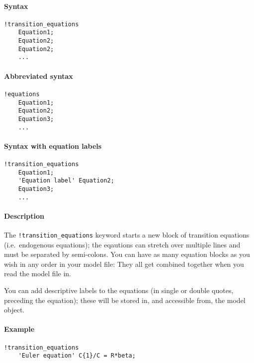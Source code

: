 


	\paragraph{Syntax}

\begin{verbatim}
!transition_equations
    Equation1;
    Equation2;
    Equation2;
    ...
\end{verbatim}

\paragraph{Abbreviated syntax}

\begin{verbatim}
!equations
    Equation1;
    Equation2;
    Equation3;
    ...
\end{verbatim}

\paragraph{Syntax with equation
labels}

\begin{verbatim}
!transition_equations
    Equation1;
    'Equation label' Equation2;
    Equation3;
    ...
\end{verbatim}

\paragraph{Description}

The \texttt{!transition\_equations} keyword starts a new block of
transition equations (i.e.~endogenous equations); the eqautions can
stretch over multiple lines and must be separated by semi-colons. You
can have as many equation blocks as you wish in any order in your model
file: They all get combined together when you read the model file in.

You can add descriptive labels to the equations (in single or double
quotes, preceding the equation); these will be stored in, and accessible
from, the model object.

\paragraph{Example}

\begin{verbatim}
!transition_equations
    'Euler equation' C{1}/C = R*beta;
\end{verbatim}


